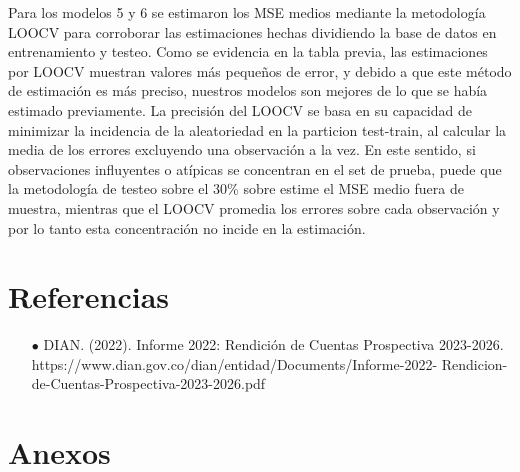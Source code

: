 \documentclass[12pt]{article}
\begin{document}



Para los modelos 5 y 6 se estimaron los MSE medios mediante la metodología LOOCV para corroborar las estimaciones hechas dividiendo la base de datos en entrenamiento y testeo. Como se evidencia en la tabla previa, las estimaciones por LOOCV muestran valores más pequeños de error, y debido a que este método de estimación es más preciso, nuestros modelos son mejores de lo que se había estimado previamente. La precisión del LOOCV se basa en su capacidad de minimizar la incidencia de la aleatoriedad en la particion test-train, al calcular la media de los errores excluyendo una observación a la vez. En este sentido, si observaciones influyentes o atípicas se concentran en el set de prueba, puede que la metodología de testeo sobre el 30\% sobre estime el MSE medio fuera de muestra, mientras que el LOOCV promedia los errores sobre cada observación y por lo tanto esta concentración no incide en la estimación.

\newpage
\section*{Referencias}

\begin{itemize}
    \item[$\bullet$] DIAN. (2022). Informe 2022: Rendición de Cuentas Prospectiva 2023-2026. \\https://www.dian.gov.co/dian/entidad/Documents/Informe-2022- Rendicion-de-Cuentas-Prospectiva-2023-2026.pdf

\end{itemize}

\newpage
\section*{Anexos}


\end{document}
